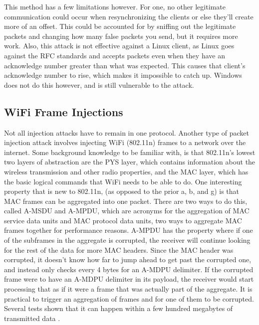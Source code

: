 \documentclass[journal]{IEEEtran}
\begin{document}
This method has a few limitations however. For one, no other legitimate communication could occur when resynchronizing the clients or else they'll create more of an offset. This could be accounted for by sniffing out the legitimate packets and changing how many false packets you send, but it requires more work. Also, this attack is not effective against a Linux client, as Linux goes against the RFC standards and accepts packets even when they have an acknowledge number greater than what was expected. This causes that client's acknowledge number to rise, which makes it impossible to catch up. Windows does not do this however, and is still vulnerable to the attack. 

\subsection{WiFi Frame Injections}

Not all injection attacks have to remain in one protocol. Another type of packet injection attack involves injecting WiFi (802.11n) frames to a network over the internet. Some background knowledge to be familiar with, is that 802.11n's lowest two layers of abstraction are the PYS layer, which contains information about the wireless transmission and other radio properties, and the MAC layer, which has the basic logical commands that WiFi needs to be able to do. One interesting property that is new to 802.11n, (as opposed to the prior a, b, and g) is that MAC frames can be aggregated into one packet. There are two ways to do this, called A-MSDU and A-MPDU, which are acronyms for the aggregation of MAC service data units and MAC protocol data units, two ways to aggregate MAC frames together for performance reasons. A-MPDU has the property where if one of the subframes in the aggregate is corrupted, the receiver will continue looking for the rest of the data for more MAC headers. Since the MAC header was corrupted, it doesn't know how far to jump ahead to get past the corrupted one, and instead only checks every 4 bytes for an A-MDPU delimiter. If the corrupted frame were to have an A-MDPU delimiter in its payload, the receiver would start processing that as if it were a frame that was actually part of the aggregate. It is practical to trigger an aggregation of frames and for one of them to be corrupted. Several tests shown that it can happen within a few hundred megabytes of transmitted data \cite{frame}.
\end{document}
